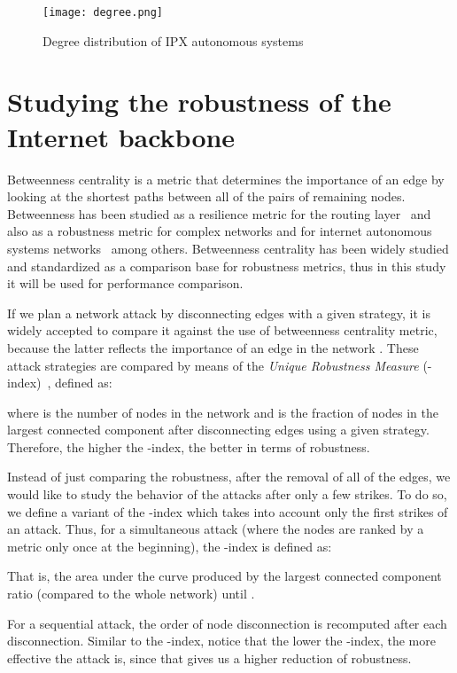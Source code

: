 \documentclass{sig-alternate-10pt}
\begin{document}
\begin{figure}[ht!]
  \centering
  \texttt{[image: degree.png]}
  \caption{Degree distribution of IPX autonomous systems}
  \label{fig:degree}
\end{figure}

\section{Studying the robustness of the Internet backbone}
\label{bet}


Betweenness centrality is a metric that determines the importance of an edge by looking at the shortest paths between all of the pairs of remaining nodes. Betweenness has been studied as a resilience metric for the routing layer~\cite{smith2011network} and also as a robustness metric for complex networks \cite{iyer2013attack} and for internet autonomous systems networks~\cite{mahadevan2006internet} among others.  Betweenness centrality has been widely studied and standardized as a comparison base for robustness metrics, thus in this study it will be used for performance comparison. 



If we plan a network attack by disconnecting edges with a given strategy, it is widely accepted to compare it against the use of  betweenness centrality metric, because the latter reflects the importance of an edge in the network \cite{iyer2013attack}. These attack strategies are compared by means of the \textit{Unique Robustness Measure} (-index)~\cite{schneider2011mitigation}, defined as: 

where  is the number of nodes in the network and  is the fraction of nodes in the largest connected component after disconnecting edges using a given strategy.  Therefore, the higher the -index, the better in terms of robustness.

Instead of just comparing the robustness, after the removal of all of the edges, we would like to study the behavior of the attacks after only a few strikes. To do so, we define a variant of the -index which takes into account only the first  strikes of an attack. Thus, for a simultaneous attack (where the nodes are ranked by a metric only once at the beginning), the -index is defined as:

That is, the area under the curve produced by the largest connected component ratio (compared to the whole network) until .

For a sequential attack, the order of node disconnection is recomputed after each disconnection. Similar to the -index, notice that the lower the -index, the more effective the attack is, since that gives us a higher reduction of robustness. 
\end{document}
